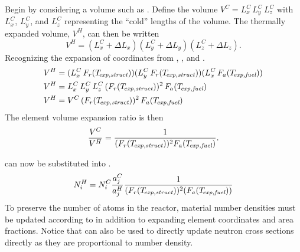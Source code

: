     Begin by considering a volume such as . Define the
    volume $V^C = L_x^C \, L_y^C \, L_z^C$ with $L_x^C$, $L_y^C$, and $L_z^C$
    representing the ``cold'' lengths of the volume. The thermally expanded
    volume, $V^H$, can then be written
    \begin{equation}
      V^H = (L_x^C + \Delta L_x) (L_y^C + \Delta L_y) (L_z^C + \Delta L_z).
    \end{equation}
    Recognizing the expansion of coordinates from ,
    , and .
    \begin{align}
      V^H &= (L_x^C \, F_r(T_{\!\mbox{\scriptsize \em exp,struct}})) (L_y^C \, F_r(T_{\!\mbox{\scriptsize \em exp,struct}})) 
        (L_x^C \, F_a({T_{\!\mbox{\scriptsize \em exp,fuel}}})) \\
      V^H &= L_x^C \, L_y^C \, L_z^C \,(F_r(T_{\!\mbox{\scriptsize \em exp,struct}}))^2 \,
        F_a({T_{\!\mbox{\scriptsize \em exp,fuel}}}) \\
      V^H &= V^C \, (F_r(T_{\!\mbox{\scriptsize \em exp,struct}}))^2 \, F_a({T_{\!\mbox{\scriptsize \em exp,fuel}}}) 
    \end{align}
    The element volume expansion ratio is then
    \begin{equation}
      \label{eq:volume_ratio}
      \frac{V^C}{V^H} = \frac{1}{(F_r(T_{\!\mbox{\scriptsize \em exp,struct}}))^2 F_a({T_{\!\mbox{\scriptsize \em exp,fuel}}})}.
    \end{equation}

     can now be substituted into
    .
    \begin{equation}
      \label{eq:nden_thexp_update}
      N_i^H = N_i^C \frac{a_j^C}{a_j^H} 
        \frac{1}{(F_r(T_{\!\mbox{\scriptsize \em exp,struct}}))^2 (F_a({T_{\!\mbox{\scriptsize \em exp,fuel}}}))}
    \end{equation}
    To preserve the number of atoms in the reactor, material number densities
    must be updated according to  in addition to
    expanding element coordinates and area fractions. Notice that
     can also be used to directly update neutron
    cross sections directly as they are proportional to number density.
    
